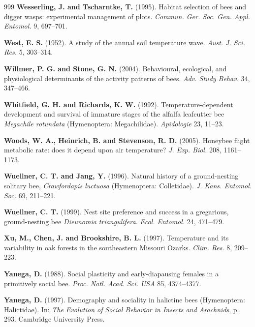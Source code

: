 \documentclass[11pt,a4paper]{article}
\begin{document}
\begin{thebibliography}{999}
\textbf{Wesserling, J. and Tscharntke, T.} (1995).
Habitat selection of bees and digger wasps: experimental management of plots.
\textit{Commun. Ger. Soc. Gen. Appl. Entomol.} 9, 697--701.

\textbf{West, E. S.} (1952).
A study of the annual soil temperature wave.
\textit{Aust. J. Sci. Res.} 5, 303--314.

\textbf{Willmer, P. G. and Stone, G. N.} (2004).
Behavioural, ecological, and physiological determinants of the activity patterns of bees.
\textit{Adv. Study Behav.} 34, 347--466.

\textbf{Whitfield, G. H. and Richards, K. W.} (1992). Temperature-dependent development and survival of immature stages of the alfalfa leafcutter bee \textit{Megachile rotundata} (Hymenoptera: Megachilidae). \textit{Apidologie} 23, 11--23.

\textbf{Woods, W. A., Heinrich, B. and Stevenson, R. D.} (2005). Honeybee flight metabolic rate: does it depend upon air temperature? \textit{J. Exp. Biol.} 208, 1161--1173.

\textbf{Wuellner, C. T. and Jang, Y.} (1996).
Natural history of a ground-nesting solitary bee, \textit{Crawfordapis luctuosa} (Hymenoptera: Colletidae).
\textit{J. Kans. Entomol. Soc.} 69, 211--221.

\textbf{Wuellner, C. T.} (1999).
Nest site preference and success in a gregarious, ground-nesting bee \textit{Dieunomia triangulifera}.
\textit{Ecol. Entomol.} 24, 471--479.

\textbf{Xu, M., Chen, J. and Brookshire, B. L.} (1997).
Temperature and its variability in oak forests in the southeastern Missouri Ozarks.
\textit{Clim. Res.} 8, 209--223.

\textbf{Yanega, D.} (1988). Social plasticity and early-diapausing females in a primitively social bee. \textit{Proc. Natl. Acad. Sci. USA} 85, 4374--4377.

\textbf{Yanega, D.} (1997). Demography and sociality in halictine bees (Hymenoptera: Halictidae). In: \textit{The Evolution of Social Behavior in Insects and Arachnids}, p. 293. Cambridge University Press.

\end{thebibliography}
\end{document}
